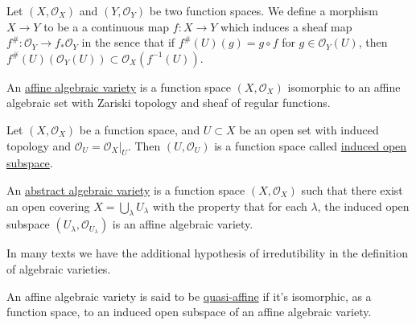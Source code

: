 \begin{dang}
    \begin{definition}
        Let $(X,\mathcal{O}_X)$ and $(Y,\mathcal{O}_Y)$ be two function spaces. We define a morphism $X\to Y$ to be a 
        a continuous map $f:X\to Y$ which induces a sheaf map $f^\#:\mathcal{O}_Y\to f_*\mathcal{O}_Y$ in the sence that 
        if $f^\#(U)(g)=g\circ f$ for $g\in\mathcal{O}_Y(U)$, then $f^\#(U)(\mathcal{O}_Y(U))\subset \mathcal{O}_X(f^{-1}(U))$.
    \end{definition}
\end{dang}

\begin{dang}
    \begin{definition}
        An \underline{affine algebraic variety} is a function space $(X,\mathcal{O}_X)$ isomorphic to 
        an affine algebraic set with Zariski topology and sheaf of regular functions.
    \end{definition}
\end{dang}


\begin{dang}
    \begin{definition}
        Let $(X,\mathcal{O}_X)$ be a function space, and $U\subset X$ be an open set with induced topology and 
        $\mathcal{O}_U=\mathcal{O}_X|_U$. Then $(U,\mathcal{O}_U)$ is a function space called 
        \underline{induced open subspace}.
    \end{definition}
\end{dang}

\begin{dang}
    \begin{definition}
        An \underline{abstract algebraic variety} is a function space $(X,\mathcal{O}_X)$ such that there exist an open covering  
        $X=\bigcup_\lambda U_\lambda$ with the property that for each $\lambda$, the induced 
        open subspace $(U_\lambda,\mathcal{O}_{U_\lambda})$ is an affine algebraic variety.
    \end{definition}
\end{dang}

\begin{dang}
    \begin{remark}
    In many texts we have the additional hypothesis of irredutibility in the definition of algebraic varieties.
\end{remark}
\end{dang}

\begin{dang}
    \begin{definition}
        An affine algebraic variety is said to be \underline{quasi-affine} if it's isomorphic, as a function space, 
        to an induced open subspace of an affine algebraic variety.
    \end{definition}
\end{dang}


